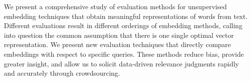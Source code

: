 We present a comprehensive study of evaluation methods for  unsupervised embedding techniques that obtain meaningful representations of words from text. Different evaluations result in different orderings of embedding methods, calling into question the common assumption that there is one single optimal vector representation. We present new evaluation techniques that directly compare embeddings with respect to specific queries. These methods reduce bias, provide greater insight, and allow us to solicit data-driven relevance judgments rapidly and accurately through crowdsourcing.
